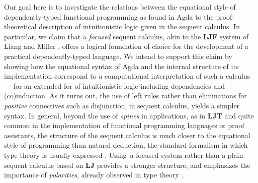 \documentclass[creativecommons]{eptcs/eptcs}
\newcommand{\LJ}{\textbf{{LJ}}\xspace}
\newcommand{\LJT}{\textbf{{LJT}}\xspace}
\newcommand{\LJF}{\textbf{{LJF}}\xspace}
\begin{document}
Our goal here is to investigate the relations between the equational style
of dependently-typed functional programming as found in Agda to the
proof-theoretical description of intuitionistic logic given in the sequent
calculus. In particular, we claim that a \emph{focused} sequent calculus,
akin to the \LJF system of Liang and Miller
\cite{liang:miller:09:focpol}, offers a logical foundation of choice for the
development of a practical dependently-typed language. We intend to support this
claim by showing how the equational syntax of Agda and the internal structure
of its implementation correspond to a computational interpretation of such
a calculus --- for an extended for of intuitionistic logic including
dependencies and (co)induction. As it turns out, the use of left rules
rather than eliminations for \emph{positive} connectives such as disjunction,
in sequent calculus, yields a simpler syntax. In general, beyond the use
of \emph{spines} in applications, as in \LJT \cite{herbelin:94:chseq} and
quite common in the implementation of functional programming languages or
proof assistants, the structure of the sequent calculus is much closer to
the equational style of programming than natural deduction, the standard
formalism in which type theory is usually expressed \cite{martinloef:84:itt}.
Using~a focused system rather than a plain sequent calculus based on \LJ
provides a stronger structure, and emphasizes the importance of
\emph{polarities}, already observed in type theory
\cite{abel:pientka:thibodeau:setzer:14:copat}.
\end{document}
